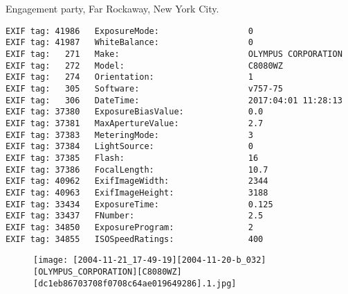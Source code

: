 \section{\protect{}}
\noindent Engagement party, Far Rockaway, New York City.
\noindent
\begin{lstlisting}
EXIF tag: 41986   ExposureMode:                  0
EXIF tag: 41987   WhiteBalance:                  0
EXIF tag:   271   Make:                          OLYMPUS CORPORATION
EXIF tag:   272   Model:                         C8080WZ
EXIF tag:   274   Orientation:                   1
EXIF tag:   305   Software:                      v757-75
EXIF tag:   306   DateTime:                      2017:04:01 11:28:13
EXIF tag: 37380   ExposureBiasValue:             0.0
EXIF tag: 37381   MaxApertureValue:              2.7
EXIF tag: 37383   MeteringMode:                  3
EXIF tag: 37384   LightSource:                   0
EXIF tag: 37385   Flash:                         16
EXIF tag: 37386   FocalLength:                   10.7
EXIF tag: 40962   ExifImageWidth:                2344
EXIF tag: 40963   ExifImageHeight:               3188
EXIF tag: 33434   ExposureTime:                  0.125
EXIF tag: 33437   FNumber:                       2.5
EXIF tag: 34850   ExposureProgram:               2
EXIF tag: 34855   ISOSpeedRatings:               400

\end{lstlisting}
\clearpage
\begin{figure}
\raggedleft
\texttt{[image: [2004-11-21\_17-49-19][2004-11-20-b\_032][OLYMPUS\_CORPORATION][C8080WZ][dc1eb86703708f0708c64ae019649286].1.jpg]}
\end{figure}


\clearpage
